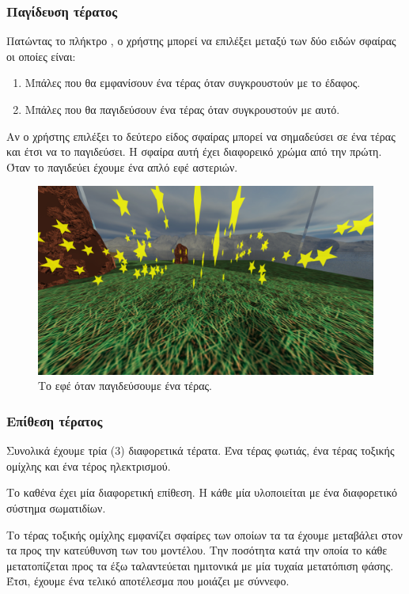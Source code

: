 \documentclass[11pt]{scrartcl} %
\newenvironment{centerimg}[1]%
{%
    \begin{figure}[H]
        #1
    \begin{center}
}%
{%
    \end{center}
    \end{figure}
}
\begin{document}
\subsubsection{Παγίδευση τέρατος}

Πατώντας το πλήκτρο , ο χρήστης μπορεί να επιλέξει μεταξύ των δύο ειδών 
σφαίρας οι οποίες είναι:
\begin{enumerate}
    \item Μπάλες που θα εμφανίσουν ένα τέρας όταν συγκρουστούν με το έδαφος.
    \item Μπάλες που θα παγιδεύσουν ένα τέρας όταν συγκρουστούν με αυτό.
\end{enumerate}

Αν ο χρήστης επιλέξει το δεύτερο είδος σφαίρας μπορεί να σημαδεύσει σε ένα τέρας και 
έτσι να το παγιδεύσει. Η σφαίρα αυτή έχει διαφορεικό χρώμα από την πρώτη. 
Όταν το παγιδεύει έχουμε ένα απλό εφέ αστεριών. 

\begin{centerimg}{\caption{Το εφέ όταν παγιδεύσουμε ένα τέρας.}}
    \includegraphics[width=.7\textwidth]{./assets/stars.png}
\end{centerimg}


\subsubsection{Επίθεση τέρατος}

Συνολικά έχουμε τρία (3) διαφορετικά τέρατα. Ένα τέρας φωτιάς, ένα τέρας τοξικής ομίχλης και ένα τέρος ηλεκτρισμού.

Το καθένα έχει μία διαφορετική επίθεση. Η κάθε μία υλοποιείται με ένα 
διαφορετικό σύστημα σωματιδίων. 

Το τέρας τοξικής ομίχλης εμφανίζει σφαίρες των οποίων τα  
τα έχουμε μεταβάλει στον   τα 
προς την κατεύθυνση των  του μοντέλου. 
Την ποσότητα κατά την οποία το κάθε  μετατοπίζεται προς 
τα έξω ταλαντεύεται ημιτονικά με μία τυχαία μετατόπιση φάσης. 
Έτσι, έχουμε ένα τελικό αποτέλεσμα που μοιάζει με σύννεφο. 
\end{document}
